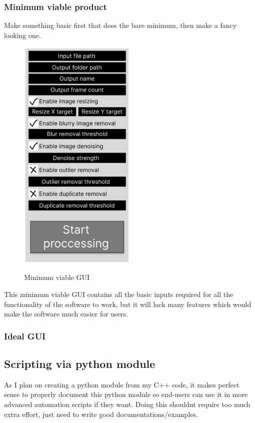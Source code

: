 \documentclass[11pt]{report}
\begin{document}
\subsubsection{Minimum viable product}
Make something basic first that does the bare minimum, then make a fancy looking one.
\begin{figure}[h!]
	\centering
	\caption{Minimum viable GUI}
	\includegraphics[width=0.5\textwidth]{designDiagrams/MVPGUI}
	\label{fig:MVPGUI}
\end{figure}
\newpage
This minimum viable GUI contains all the basic inputs required for all the functionality of the software to work, but it will lack many features which would make the software much easier for users.
\subsubsection{Ideal GUI}
\subsection{Scripting via python module}
As I plan on creating a python module from my C++ code, it makes perfect sense to properly document this python module so end-users can use it in more advanced automation scripts if they want. Doing this shouldnt require too much extra effort, just need to write good documentations/examples.
\end{document}
